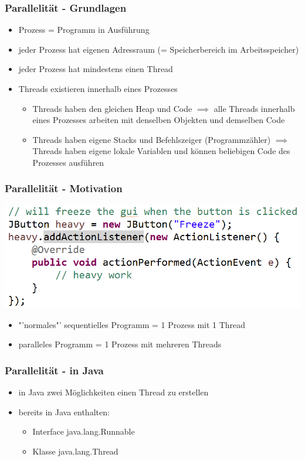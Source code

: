 \documentclass[18pt]{beamer}
\begin{document}
	\begin{frame}
		\frametitle{Parallelität - Grundlagen}
		\begin{itemize}
			\item Prozess = Programm in Ausführung \pause
			\item jeder Prozess hat eigenen Adressraum (= Speicherbereich im Arbeitsspeicher) \pause
			\item jeder Prozess hat mindestens einen Thread \pause
			\item Threads existieren innerhalb eines Prozesses \pause 
			\begin{itemize}
				\item Threads haben den gleichen Heap und Code \pause 
					\linebreak $\implies$ alle Threads innerhalb eines Prozesses arbeiten mit denselben Objekten und demselben Code \pause 
				\item Threads haben eigene Stacks und Befehlszeiger (Programmzähler) \pause 
					\linebreak $\implies$ Threads haben eigene lokale Variablen und können beliebigen Code des Prozesses ausführen
			\end{itemize}
		\end{itemize}
	\end{frame}
	
	
	\begin{frame}
		\frametitle{Parallelität - Motivation}
		\includegraphics[scale=0.34]{./pics/tut5/mot-par.png}
		\pause
		\begin{itemize}
			\item "'normales"' sequentielles Programm = 1 Prozess mit 1 Thread
			\item paralleles Programm = 1 Prozess mit mehreren Threads
		\end{itemize}
	\end{frame}

	\begin{frame}
		\frametitle{Parallelität - in Java}
		\begin{itemize}
			\item in Java zwei Möglichkeiten einen Thread zu erstellen
			\item bereits in Java enthalten:
			\begin{itemize}
				\item Interface java.lang.Runnable
				\item Klasse java.lang.Thread
			\end{itemize}
		\end{itemize}
	\end{frame}
\end{document}
